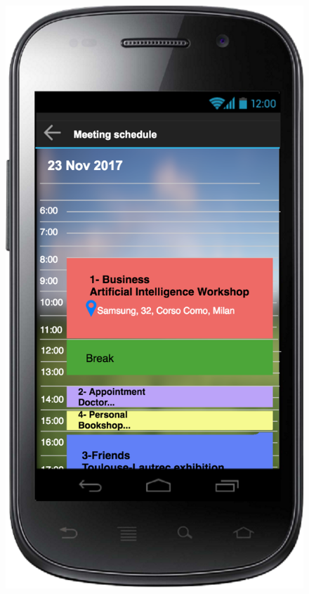 \documentclass[a4paper,leqno]{article}
\begin{document}
\begin{figure}
\begin{minipage}[!h]{0.45\linewidth}
		\centering
		\includegraphics[scale = 0.15]{meetingSchedule.png}
	\end{minipage}
\end{figure}
\end{document}
